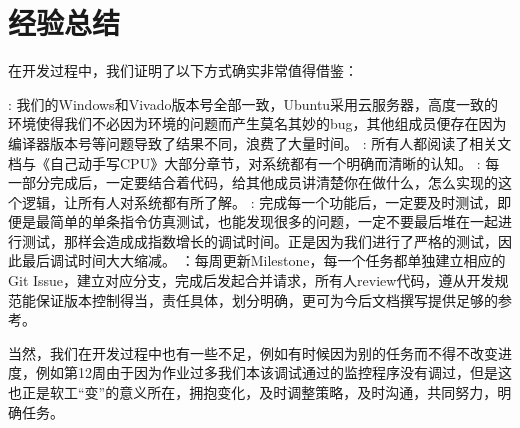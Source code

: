 \chapter{经验总结}

    在开发过程中，我们证明了以下方式确实非常值得借鉴：

    \begin{enumerate}
        : 我们的Windows和Vivado版本号全部一致，Ubuntu采用云服务器，高度一致的环境使得我们不必因为环境的问题而产生莫名其妙的bug，其他组成员便存在因为编译器版本号等问题导致了结果不同，浪费了大量时间。
        : 所有人都阅读了相关文档与《自己动手写CPU》大部分章节，对系统都有一个明确而清晰的认知。
        : 每一部分完成后，一定要结合着代码，给其他成员讲清楚你在做什么，怎么实现的这个逻辑，让所有人对系统都有所了解。
        : 完成每一个功能后，一定要及时测试，即便是最简单的单条指令仿真测试，也能发现很多的问题，一定不要最后堆在一起进行测试，那样会造成成指数增长的调试时间。正是因为我们进行了严格的测试，因此最后调试时间大大缩减。
        ：每周更新Milestone，每一个任务都单独建立相应的Git Issue，建立对应分支，完成后发起合并请求，所有人review代码，遵从开发规范能保证版本控制得当，责任具体，划分明确，更可为今后文档撰写提供足够的参考。
    \end{enumerate}

    当然，我们在开发过程中也有一些不足，例如有时候因为别的任务而不得不改变进度，例如第12周由于因为作业过多我们本该调试通过的监控程序没有调过，但是这也正是软工“变”的意义所在，拥抱变化，及时调整策略，及时沟通，共同努力，明确任务。





